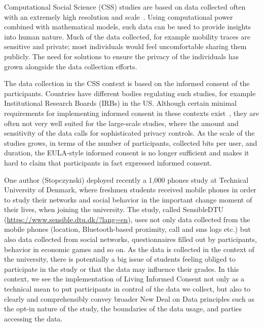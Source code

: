 Computational Social Science (CSS) studies are based on data collected often with an extremely high resolution and scale~\cite{lazer2009life}.
Using computational power combined with mathematical models, such data can be used to provide insights into human nature.
Much of the data collected, for example mobility traces are sensitive and private; most individuals would feel uncomfortable sharing them publicly.
The need for solutions to ensure the privacy of the individuals has grown alongside the data collection efforts.

The data collection in the CSS context is based on the informed consent of the participants. 
Countries have different bodies regulating such studies, for example Institutional Research Boards (IRBs) in the US. Although certain minimal requirements for implementing informed consent in these contexts exist~\cite{IMM2013-06632}, they are often not very well suited for the large-scale studies, where the amount and sensitivity of the data calls for sophisticated privacy controls.
As the scale of the studies grows, in terms of the number of participants, collected bits per user, and duration, the EULA-style informed consent is no longer sufficient and makes it hard to claim that participants in fact expressed informed consent.

One author (Stopczynski) deployed recently a 1,000 phones study at Technical University of Denmark, where freshmen students received mobile phones in order to study their networks and social behavior in the important change moment of their lives, when joining the university.
The study, called SensibleDTU (\url{https://www.sensible.dtu.dk/?lang=en}), uses not only data collected from the mobile phones (location, Bluetooth-based proximity, call and sms logs etc.) but also data collected from social networks, questionnaires filled out by participants, behavior in economic games and so on.
As the data is collected in the context of the university, there is potentially a big issue of students feeling obliged to participate in the study or that the data may influence their grades.
In this context, we see the implementation of Living Informed Consent not only as a technical mean to put participants in control of the data we collect, but also to clearly and comprehensibly convey broader New Deal on Data principles such as the opt-in nature of the study, the boundaries of the data usage, and parties accessing the data.

